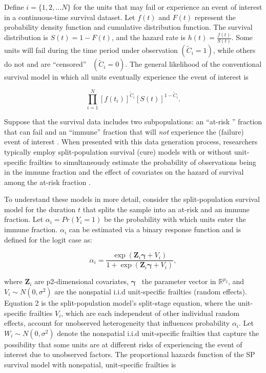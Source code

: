 Define $i=\{1,2,...N\}$ for the units that may fail or experience an event of
interest in a continuous-time survival dataset. Let $f(t)$ and $F(t)$
represent the probability density function and cumulative distribution
function. The survival distribution is
$S(t)=1-F(t)$, and the hazard rate is $h(t)=\frac{f(t)}{S(t)}$. Some units will
fail during the time period under observation $(\widetilde{C}_{i}=1)$, while
others do not and are \textquotedblleft censored\textquotedblright%
\ $(\widetilde{C}_{i}=0)$. The general likelihood of the conventional
survival model in which all units eventually experience the
event of interest is

\begin{equation}
{\textstyle\prod\limits_{i=1}^{N}}
\left[f\left(t_{i}\right)\right]^{\widetilde{C}_{i}}\left[S\left(t\right)\right]^{1-\widetilde{C}_{i}}.%
\end{equation}


\noindent Suppose that the survival data includes two
subpopulations: an ``at-risk '' fraction that
can fail and an ``immune'' fraction that will
\emph{not} experience the (failure) event of interest \citep{maller1996survival,yin2005cure,beger2017splitting}. When presented with this
data generation process, researchers typically employ split-population
survival (cure) models with or without unit-specific frailties to
simultaneously estimate the probability of observations being in the immune
fraction and the effect of covariates on the hazard of survival among
the at-risk fraction \citep{maller1996survival,lu2010,peng2014cure}.


To understand these models in more detail, consider the split-population
survival model for the duration $t$ that splits the sample into an at-risk and
an immune fraction. Let $\alpha_{i}=Pr(Y_{i}=1)$ be the probability with which
units enter the immune fraction. $\alpha_{i}$ can be estimated via a binary
response function and is defined for the logit case as:

\begin{equation}
\alpha_{i}=\frac{\exp\left(\mathbf{Z}_{i}\boldsymbol{\gamma}+V_{i}\right)}{1+\exp
\left(\mathbf{Z}_{i}\boldsymbol{\gamma}+V_{i}\right)},
\end{equation}


\noindent where $\mathbf{Z}_{i}$ are p2-dimensional covariates, $\boldsymbol{\gamma
}$ \ the parameter vector in $\mathbb{R}^{p_{2}}$, and
$V_{i}\sim N(0,\sigma^{2})$ are the nonspatial i.i.d unit-specific frailties
(random effects). Equation 2 is the split-population model's split-stage
equation, where the unit-specific frailties $V_{i}$, which are
each independent of other individual random effects, account for
unobserved heterogeneity that influences probability $\alpha_{i}$. Let $W_{i}\sim
N(0,\sigma^{2})$ denote the nonspatial i.i.d unit-specific frailties that
capture the possibility that some units are at different risks of experiencing
the event of interest due to unobserved factors. The proportional hazards function of
the SP survival model with nonspatial, unit-specific frailties is


